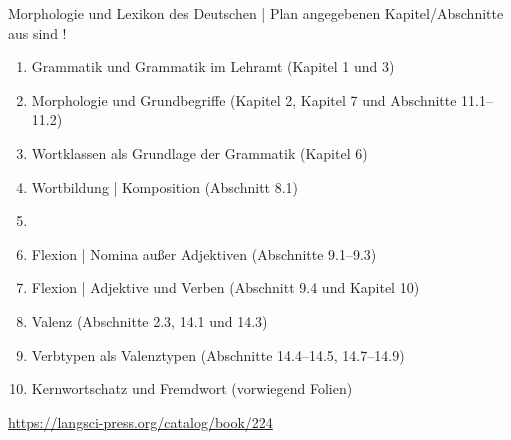   \begin{frame}
    {Morphologie und Lexikon des Deutschen | Plan}
     angegebenen Kapitel\slash Abschnitte aus  sind !\\
    \Halbzeile
    \begin{enumerate}
      \item Grammatik und Grammatik im Lehramt (Kapitel 1 und 3)
      \item Morphologie und Grundbegriffe (Kapitel 2, Kapitel 7 und Abschnitte 11.1--11.2)
      \item Wortklassen als Grundlage der Grammatik (Kapitel 6)
      \item Wortbildung | Komposition (Abschnitt 8.1)
      \item {}
      \item Flexion | Nomina außer Adjektiven (Abschnitte 9.1--9.3)
      \item Flexion | Adjektive und Verben (Abschnitt 9.4 und Kapitel 10)
      \item Valenz (Abschnitte 2.3, 14.1 und 14.3)
      \item Verbtypen als Valenztypen (Abschnitte 14.4--14.5, 14.7--14.9) 
      \item Kernwortschatz und Fremdwort (vorwiegend Folien)
    \end{enumerate}
    \Halbzeile
    \centering 
    \url{https://langsci-press.org/catalog/book/224}
  \end{frame}
\fi
